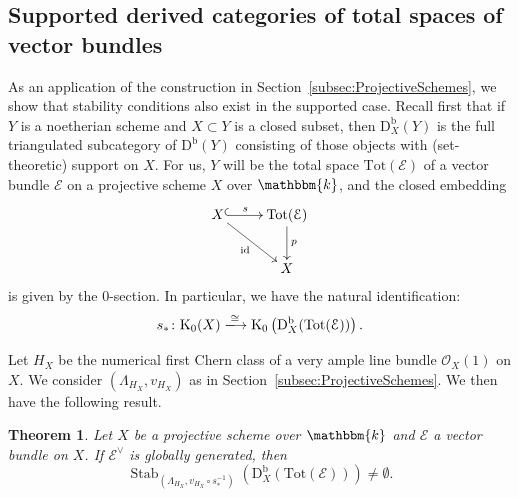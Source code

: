 \documentclass[11pt, reqno]{amsart}
\numberwithin{equation}{section}
\theoremstyle{plain}
\newtheorem{theorem}{Theorem}[section]
\theoremstyle{remark}
\theoremstyle{definition}
\theoremstyle{italicsname}
\newcommand{\Db}{\mathrm{D^b}}
\DeclareMathOperator{\Stab}{Stab}
\newcommand{\cO}{\mathcal{O}}
\newcommand{\cE}{\mathcal{E}}
\newcommand{\rK}{\mathrm{K}}
\newcommand{\KK}{\mathbbm{k}}
\begin{document}
\subsection{Supported derived categories of total spaces of vector bundles}
\label{subsec:LocalFano}

As an application of the construction in Section~\ref{subsec:ProjectiveSchemes}, we show that stability conditions also exist in the supported case.
Recall first that if $Y$ is a noetherian scheme and $X\subset Y$ is a closed subset, then $\mathrm{D}_X^{\mathrm{b}}(Y)$ is the full triangulated subcategory of $\Db(Y)$ consisting of those objects with (set-theoretic) support on $X$.
For us, $Y$ will be the total space $\mathrm{Tot}(\cE)$ of a vector bundle $\cE$ on a projective scheme $X$ over $\KK$, and the closed embedding
\[
\xymatrix{
X\ar@{^{(}->}[r]^-{s}\ar[dr]_-{\mathrm{id}}&\mathrm{Tot}(\cE)\ar[d]^-{p}\\
&X
}
\]
is given by the $0$-section.
In particular, we have the natural identification:
\begin{equation*}
s_*\colon \rK_0(X)\xlongrightarrow{\cong}\rK_0\left(\mathrm{D}_X^{\mathrm{b}}(\mathrm{Tot}(\cE))\right).
\end{equation*}

Let $H_X$ be the numerical first Chern class of a very ample line bundle $\cO_X(1)$ on $X$.
We consider $(\Lambda_{H_X},v_{H_X})$ as in Section~\ref{subsec:ProjectiveSchemes}.
We then have the following result.

\begin{theorem}\label{thm:stabonlocal}
Let $X$ be a projective scheme over $\KK$ and $\cE$ a vector bundle on $X$. 
If $\cE^{\vee}$ is globally generated, then
\[
\Stab_{(\Lambda_{H_X},v_{H_X}\circ s_*^{-1})}\left(\mathrm{D}_X^{\mathrm{b}}(\mathrm{Tot}(\cE))\right)\neq\emptyset.
\]
\end{theorem}
\end{document}
